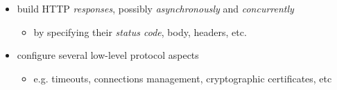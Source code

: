 \documentclass[presentation]{beamer}\mode<presentation>{\usetheme{AMSCesenaPurpleAndGold}}
\begin{document}
\begin{frame}
\begin{itemize}
        \vfill

        \item build HTTP \emph{responses}, possibly \emph{asynchronously} and \emph{concurrently}
        \begin{itemize}
            \item by specifying their \emph{status code}, body, headers, etc.
        \end{itemize}

        \vfill

        \item configure several low-level protocol aspects
        \begin{itemize}
            \item e.g. timeouts, connections management, cryptographic certificates, etc
        \end{itemize}
    \end{itemize}
\end{frame}
\end{document}
